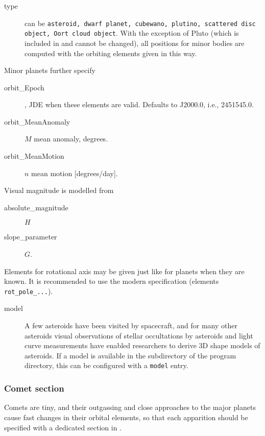 \begin{description}
\item[type] can be \texttt{asteroid, dwarf planet, cubewano,
  plutino, scattered disc object, Oort cloud object}. With the
exception of Pluto (which is included in  and cannot be changed), 
all positions for minor bodies are computed with the orbiting elements given in this way. 
\end{description}

Minor planets further specify
\begin{description}
\item[orbit\_Epoch], JDE when these elements are valid. Defaults to J2000.0, i.e., 2451545.0. 
\item[orbit\_MeanAnomaly] $M$ mean anomaly, degrees. 
\item[orbit\_MeanMotion] $n$ mean motion [degrees/day].
\end{description}

Visual magnitude is modelled from
\begin{description}
\item[absolute\_magnitude] $H$
\item[slope\_parameter] $G$.
\end{description}

Elements for rotational axis may be given just like for planets when
they are known. It is recommended to use the modern specification
(elements \texttt{rot\_pole\_...}).

\begin{description}
\item[model]
A few asteroids have been visited by spacecraft, 
and for many other asteroids visual observations of stellar occultations 
by asteroids and light curve measurements have enabled researchers to derive 
3D shape models of asteroids. If a model is available in the  
subdirectory of the program directory, this can be configured with a \texttt{model} entry.
\end{description}


\subsubsection{Comet section}
\label{sec:ssystem.ini:Comet}

Comets are tiny, and their outgassing and close approaches to the
major planets cause fast changes in their orbital elements, so that
each apparition should be specified with a dedicated section in
.

